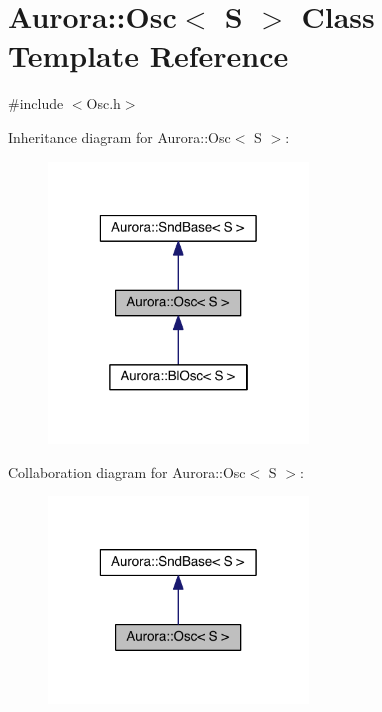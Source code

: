 \hypertarget{class_aurora_1_1_osc}{}\section{Aurora\+:\+:Osc$<$ S $>$ Class Template Reference}
\label{class_aurora_1_1_osc}


{\ttfamily \#include $<$Osc.\+h$>$}



Inheritance diagram for Aurora\+:\+:Osc$<$ S $>$\+:\nopagebreak
\begin{figure}[H]
\begin{center}
\leavevmode
\includegraphics[width=196pt]{class_aurora_1_1_osc__inherit__graph}
\end{center}
\end{figure}


Collaboration diagram for Aurora\+:\+:Osc$<$ S $>$\+:\nopagebreak
\begin{figure}[H]
\begin{center}
\leavevmode
\includegraphics[width=196pt]{class_aurora_1_1_osc__coll__graph}
\end{center}
\end{figure}
